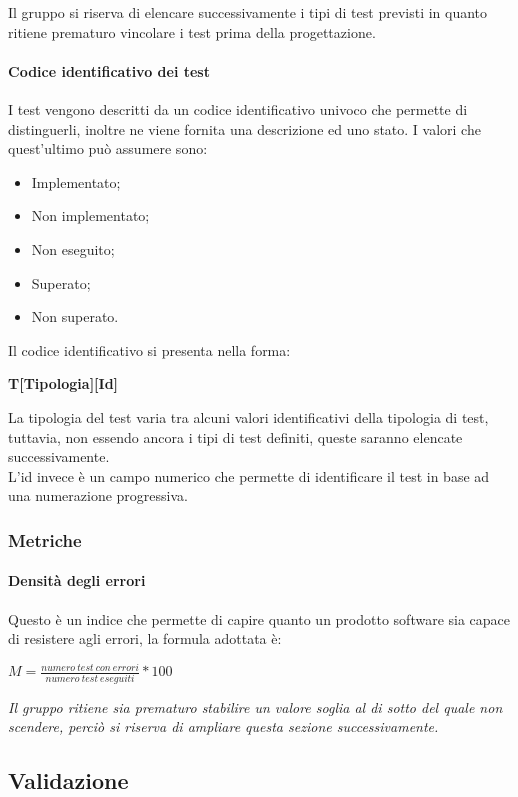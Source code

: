 Il gruppo si riserva di elencare successivamente i tipi di test previsti in quanto ritiene prematuro vincolare i test 
prima della progettazione.

\paragraph{Codice identificativo dei test}
I test vengono descritti da un codice identificativo univoco che permette di distinguerli, inoltre ne viene fornita una 
descrizione ed uno stato. I valori che quest'ultimo può assumere sono:
\begin{itemize}
    \item Implementato;
    \item Non implementato;
    \item Non eseguito;
    \item Superato;
    \item Non superato.
\end{itemize}
Il codice identificativo si presenta nella forma:
\begin{center}
    \textbf{T[Tipologia][Id]}
\end{center}
La tipologia del test varia tra alcuni valori identificativi della tipologia di test, tuttavia, non essendo ancora i 
tipi di test definiti, queste saranno elencate successivamente.\\
L'id invece è un campo numerico che permette di identificare il test in base ad una numerazione progressiva.

\subsubsection{Metriche}

\paragraph{Densità degli errori}

Questo è un indice che permette di capire quanto un prodotto software sia capace di resistere agli errori, la formula 
adottata è:
\begin{center}
    \textbf{$M = \frac{numero\ test\ con\ errori}{numero\ test\ eseguiti} * 100$}
\end{center}
\emph{Il gruppo ritiene sia prematuro stabilire un valore soglia al di sotto del quale non scendere, perciò si riserva 
di ampliare questa sezione successivamente.}

\subsection{Validazione}

